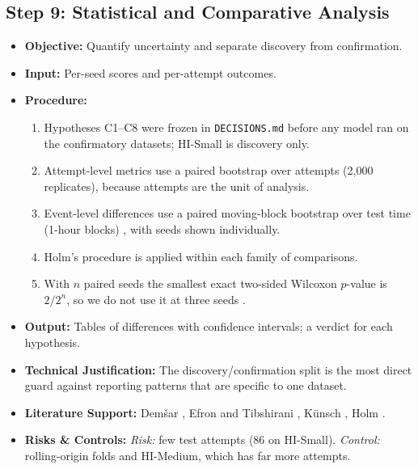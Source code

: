 \documentclass[11pt,a4paper]{article}
\begin{document}
\subsection{Step 9: Statistical and Comparative Analysis}
\begin{itemize}[leftmargin=*]
    \item \textbf{Objective:} Quantify uncertainty and separate discovery from confirmation.
    \item \textbf{Input:} Per-seed scores and per-attempt outcomes.
    \item \textbf{Procedure:}
    \begin{enumerate}[leftmargin=*]
        \item Hypotheses C1--C8 were frozen in \texttt{DECISIONS.md} before any model ran on the confirmatory datasets; HI-Small is discovery only.
        \item Attempt-level metrics use a paired bootstrap over attempts (2,000 replicates), because attempts are the unit of analysis.
        \item Event-level differences use a paired moving-block bootstrap over test time (1-hour blocks) \cite{kunsch1989bootstrap,efron1993bootstrap}, with seeds shown individually.
        \item Holm's procedure \cite{holm1979simple} is applied within each family of comparisons.
        \item With $n$ paired seeds the smallest exact two-sided Wilcoxon $p$-value is $2/2^n$, so we do not use it at three seeds \cite{demsar2006statistical}.
    \end{enumerate}
    \item \textbf{Output:} Tables of differences with confidence intervals; a verdict for each hypothesis.
    \item \textbf{Technical Justification:} The discovery/confirmation split is the most direct guard against reporting patterns that are specific to one dataset.
    \item \textbf{Literature Support:} Dem\v{s}ar \cite{demsar2006statistical}, Efron and Tibshirani \cite{efron1993bootstrap}, K\"unsch \cite{kunsch1989bootstrap}, Holm \cite{holm1979simple}.
    \item \textbf{Risks \& Controls:} \textit{Risk:} few test attempts (86 on HI-Small). \textit{Control:} rolling-origin folds and HI-Medium, which has far more attempts.
\end{itemize}
\end{document}
